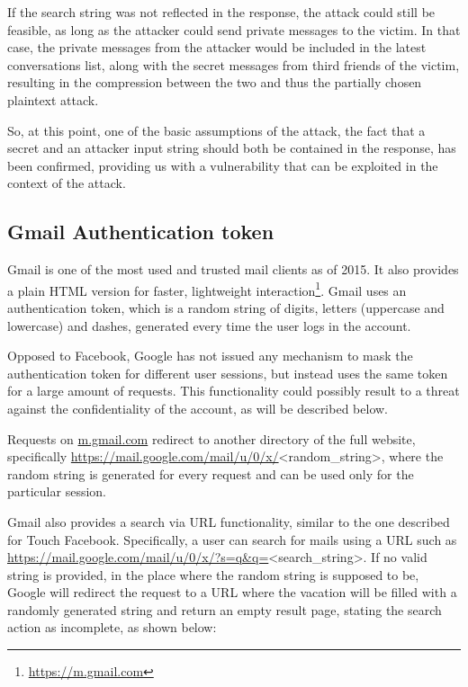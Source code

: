 If the search string was not reflected in the response, the attack could still
be feasible, as long as the attacker could send private messages to the victim.
In that case, the private messages from the attacker would be included in the
latest conversations list, along with the secret messages from third friends of
the victim, resulting in the compression between the two and thus the partially
chosen plaintext attack.

So, at this point, one of the basic assumptions of the attack, the fact that a
secret and an attacker input string should both be contained in the response,
has been confirmed, providing us with a vulnerability that can be exploited in
the context of the attack.

\subsection{Gmail Authentication token}

Gmail is one of the most used and trusted mail clients as of 2015. It also
provides a plain HTML version for faster, lightweight
interaction\footnote{\url{https://m.gmail.com}}. Gmail uses an authentication
token, which is a random string of digits, letters (uppercase and lowercase) and
dashes, generated every time the user logs in the account.

Opposed to Facebook, Google has not issued any mechanism to mask the
authentication token for different user sessions, but instead uses the same
token for a large amount of requests. This functionality could possibly result
to a threat against the confidentiality of the account, as will be described
below.

Requests on \url{m.gmail.com} redirect to another directory of the full website,
specifically \url{https://mail.google.com/mail/u/0/x/}<random\_string>, where
the random string is generated for every request and can be used only for the
particular session.

Gmail also provides a search via URL functionality, similar to the one described
for Touch Facebook. Specifically, a user can search for mails using a URL such
as \url{https://mail.google.com/mail/u/0/x/?s=q&q=}<search\_string>. If no
valid string is provided, in the place where the random string is supposed
to be, Google will redirect the request to a URL where the vacation will be
filled with a randomly generated string and return an empty result page,
stating the search action as incomplete, as shown below:

